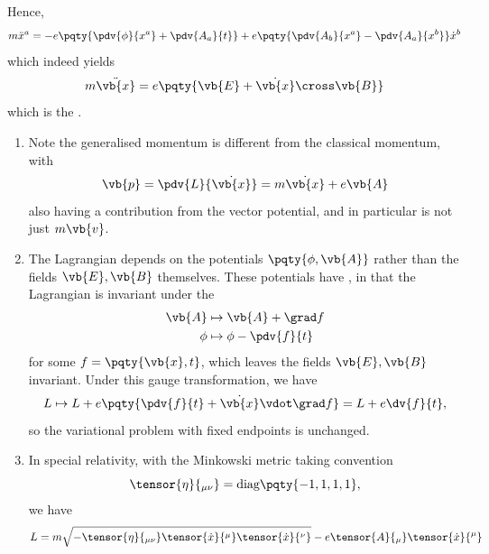 Hence,
\begin{equation}
    m \ddot{x}^a = -e \pqty{\pdv{\phi}{x^a} + \pdv{A_a}{t}} + e \pqty{\pdv{A_b}{x^a} - \pdv{A_a}{x^b}} \dot{x}^b
\end{equation}
which indeed yields
\begin{equation}
    m \ddot{\vb{x}} = e \pqty{\vb{E} + \dot{\vb{x}} \cross \vb{B}}
\end{equation}
which is the .

\begin{remarks}
    \begin{enumerate}
        \item Note the generalised momentum is different from the classical momentum, with
        \begin{equation}
            \vb{p} = \pdv{L}{\dot{\vb{x}}} = m \dot{\vb{x}} + e \vb{A}
        \end{equation}
        also having a contribution from the vector potential, and in particular is not just \(m \vb{v}\).
        \item The Lagrangian depends on the potentials \(\pqty{\phi, \vb{A}}\) rather than the fields \(\vb{E}, \vb{B}\) themselves. These potentials have , in that the Lagrangian is invariant under the 
        \begin{subequations}
            \begin{align}
                \vb{A} &\mapsto \vb{A} + \grad f \\
                \phi &\mapsto \phi - \pdv{f}{t}
            \end{align}
        \end{subequations}
        for some \(f = \pqty{\vb{x}, t}\), which leaves the fields \(\vb{E}, \vb{B}\) invariant. Under this gauge transformation, we have
        \begin{equation}
            L \mapsto L + e \pqty{\pdv{f}{t} + \dot{\vb{x}} \vdot \grad f} = L + e \dv{f}{t},
        \end{equation}
        so the variational problem with fixed endpoints is unchanged.
        \item In special relativity, with the Minkowski metric taking convention
        \begin{equation}
            \tensor{\eta}{_{\mu\nu}} = \text{diag}\pqty{-1, 1, 1, 1},
        \end{equation}
        we have
        \begin{equation}
            L = m \sqrt{- \tensor{\eta}{_{\mu \nu}} \tensor{\dot{x}}{^\mu} \tensor{\dot{x}}{^\nu}} - e \tensor{A}{_\mu} \tensor{\dot{x}}{^\mu}

\end{equation}
\end{enumerate}
\end{remarks}
